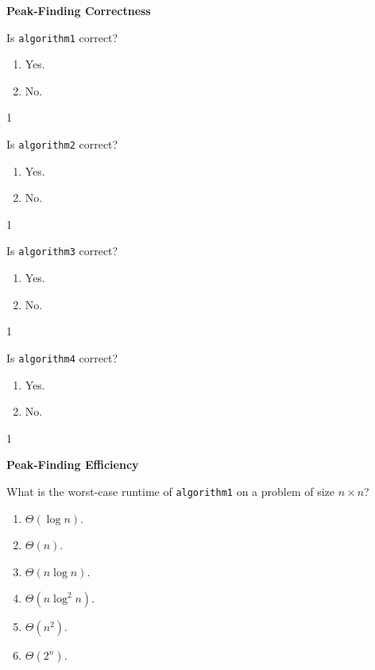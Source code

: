 \documentclass[12pt,twoside]{article}
\begin{document}
\begin{exercises}
\problem {} \textbf{Peak-Finding Correctness}

\begin{problemparts}

\problempart {} Is \texttt{algorithm1} correct?
\begin{enumerate}
\item Yes.
\item No.
\end{enumerate}

\ifsolution \solution{}
1
\fi

\problempart {} Is \texttt{algorithm2} correct?
\begin{enumerate}
\item Yes.
\item No.
\end{enumerate}

\ifsolution \solution{}
1
\fi

\problempart {} Is \texttt{algorithm3} correct?
\begin{enumerate}
\item Yes.
\item No.
\end{enumerate}

\ifsolution \solution{}
1
\fi

\problempart {} Is \texttt{algorithm4} correct?
\begin{enumerate}
\item Yes.
\item No.
\end{enumerate}

\ifsolution \solution{}
1
\fi

\end{problemparts}

\problem {} \textbf{Peak-Finding Efficiency}

\begin{problemparts}

\problempart {} What is the worst-case runtime of \texttt{algorithm1} on a problem of size $n \times n$?
\begin{enumerate}
\item $\Theta(\log n)$.
\item $\Theta(n)$.
\item $\Theta(n \log n)$.
\item $\Theta(n \log^2 n)$.
\item $\Theta(n^2)$.
\item $\Theta(2^n)$.
\end{enumerate}


\end{problemparts}
\end{exercises}
\end{document}
